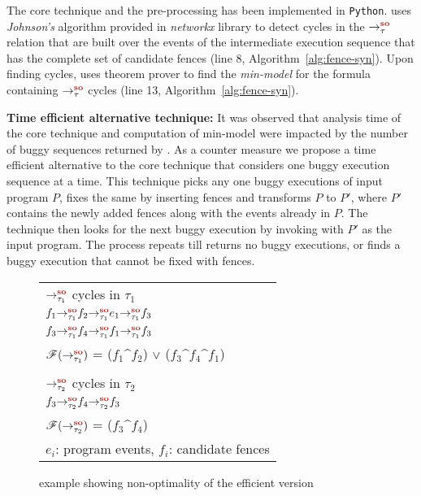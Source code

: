 The core technique and the pre-processing has been implemented in 
{\tt Python}.
\ourtechnique uses {\em Johnson's} algorithm provided in {\em networkx}
library to detect cycles in the $\setSO$ relation that are built over the \sc
events of the intermediate execution sequence that has the complete set 
of candidate fences (line 8, Algorithm~\ref{alg:fence-syn}).
%
Upon finding cycles, \ourtechnique uses \z theorem prover to find the 
{\em min-model} for the formula containing $\setSO$ cycles (line 13, 
Algorithm~\ref{alg:fence-syn}).

{\bf Time efficient alternative technique:} It was observed that analysis
time of the core technique and \z computation of min-model were impacted
by the number of buggy sequences returned by \cds.
%
As a counter measure we propose a time efficient alternative to the core 
technique that considers one buggy execution sequence at a time.
%
This technique picks any one buggy executions of input program $P$,
fixes the same by inserting \sc fences and  transforms $P$ to $P'$,
where $P'$ contains the newly added \sc fences along with the events already
in $P$. 
%
The technique then looks for the next buggy execution by invoking \cds 
with $P'$ as the input program. 
The process repeats till \cds returns no buggy executions, or
finds a buggy execution that cannot be fixed with \sc fences.

\begin{wrapfigure}{l}{0.45\textwidth}
	\begin{tabular}{|l|}
		\hline
		$\so{\tau_1}{}{}$ cycles in $\tau_1$\\
		\tab$\so{\tau_1}{\so{\tau_1}{\so{\tau_1}{f_1}{f_2}}{e_1}}{f_3}$\\
		\tab$\so{\tau_1}{\so{\tau_1}{\so{\tau_1}{f_3}{f_4}}{f_1}}{f_3}$\\
		$\formula{\so{\tau_1}{}{}}$ = ($f_1 \^ f_2$) $\vee$ ($f_3 \^ f_4 \^ f_1$)\\
		\\
		$\so{\tau_2}{}{}$ cycles in $\tau_2$\\
		\tab$\so{\tau_2}{\so{\tau_2}{f_3}{f_4}}{f_3}$\\
		$\formula{\so{\tau_2}{}{}}$ = ($f_3 \^ f_4$)\\
		\hline
		\multicolumn{1}{r}{\scriptsize $e_i$: program events,
					$f_i$: candidate fences}
	\end{tabular}
	\caption{example showing non-optimality of the efficient version }
	\label{fig:eg}
\end{wrapfigure}

